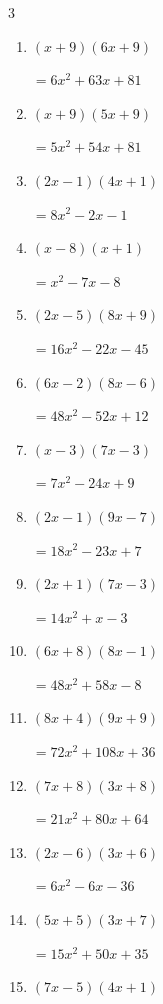 \begin{multicols}{3}
\begin{enumerate}
        $=36x^{2}+30x+6$

\columnbreak %

  \item $(x+9)(6x+9)$

        $=6x^{2}+63x+81$

  \item $(x+9)(5x+9)$

        $=5x^{2}+54x+81$

  \item $(2x-1)(4x+1)$

        $=8x^{2}-2x-1$

  \item $(x-8)(x+1)$

        $=x^{2}-7x-8$

  \item $(2x-5)(8x+9)$

        $=16x^{2}-22x-45$

  \item $(6x-2)(8x-6)$

        $=48x^{2}-52x+12$

  \item $(x-3)(7x-3)$

        $=7x^{2}-24x+9$

  \item $(2x-1)(9x-7)$

        $=18x^{2}-23x+7$

  \item $(2x+1)(7x-3)$

        $=14x^{2}+x-3$

  \item $(6x+8)(8x-1)$

        $=48x^{2}+58x-8$

  \item $(8x+4)(9x+9)$

        $=72x^{2}+108x+36$

  \item $(7x+8)(3x+8)$

        $=21x^{2}+80x+64$

  \item $(2x-6)(3x+6)$

        $=6x^{2}-6x-36$

  \item $(5x+5)(3x+7)$

        $=15x^{2}+50x+35$

  \item $(7x-5)(4x+1)$


\end{enumerate}
\end{multicols}
